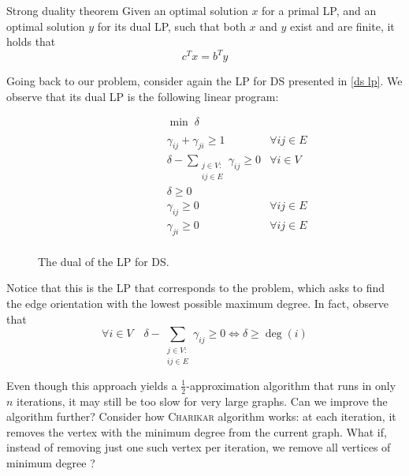 \documentclass[a4paper, 12pt]{report}
\begin{document}
    \begin{framedthm}{Strong duality theorem}
        Given an optimal solution $x$ for a primal LP, and an optimal solution $y$ for its dual LP, such that both $x$ and $y$ exist and are finite, it holds that $$c^Tx = b^Ty$$
    \end{framedthm}

    Going back to our problem, consider again the LP for DS presented in \cref{ds lp}. We observe that its dual LP is the following linear program:

    \begin{figure}[H]
        \centering
        \[\begin{array}{ccl}
            \qquad\qquad\quad
            & \min \; \delta \\\\
            & \gamma_{ij} + \gamma_{ji} \ge 1 & \forall i j \in E \\
            & \delta - \sum\limits_{\substack{j \in V : \\ ij \in E}}{\gamma_{ij}} \ge 0 & \forall i \in V \\
            & \delta \ge 0 \\
            & \gamma_{ij} \ge 0 & \forall i j \in E \\
            & \gamma_{ji} \ge 0 & \forall i j \in E \\
        \end{array}\]
        \caption{The dual of the LP for DS.}
    \end{figure}
    
    Notice that this is the LP that corresponds to the  problem, which asks to find the edge orientation with the lowest possible maximum degree. In fact, observe that $$\forall i \in V \quad \delta - \sum_{\substack{j \in V : \\ ij \in E}}{\gamma_{ij}} \ge 0 \iff \delta \ge \deg(i)$$

    Even though this approach yields a $\tfrac{1}{2}$-approximation algorithm that runs in only $n$ iterations, it may still be too slow for very large graphs. Can we improve the algorithm further? Consider how \textsc{Charikar} algorithm works: at each iteration, it removes the vertex with the minimum degree from the current graph. What if, instead of removing just one such vertex per iteration, we remove all vertices of minimum degree ?
\end{document}
